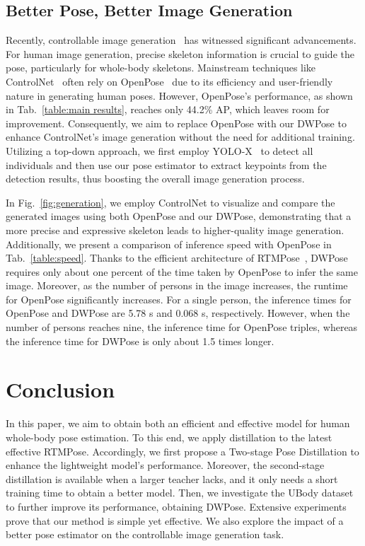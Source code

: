 \documentclass[10pt,twocolumn,letterpaper]{article}
\begin{document}
\subsection{Better Pose, Better Image Generation}
\label{sec:control}

Recently, controllable image generation~\cite{gong2023talecrafter,rombach2022high,sohl2015deep,zhang2023adding,mou2023t2i,ju2023humansd} has witnessed significant advancements. For human image generation, precise skeleton information is crucial to guide the pose, particularly for whole-body skeletons.
Mainstream techniques like ControlNet~\cite{zhang2023adding} often rely on OpenPose~\cite{cao2021openpose} due to its efficiency and user-friendly nature in generating human poses. However, OpenPose's performance, as shown in Tab.~\ref{table:main results}, reaches only 44.2\% AP, which leaves room for improvement. Consequently, we aim to replace OpenPose with our DWPose to enhance ControlNet's image generation without the need for additional training. Utilizing a top-down approach, we first employ YOLO-X~\cite{ge2021yolox} to detect all individuals and then use our pose estimator to extract keypoints from the detection results, thus boosting the overall image generation process.

In Fig.~\ref{fig:generation}, we employ ControlNet to visualize and compare the generated images using both OpenPose and our DWPose, demonstrating that a more precise and expressive skeleton leads to higher-quality image generation. Additionally, we present a comparison of inference speed with OpenPose in Tab.~\ref{table:speed}. Thanks to the efficient architecture of RTMPose~\cite{jiang2023rtmpose}, DWPose requires only about one percent of the time taken by OpenPose to infer the same image. Moreover, as the number of persons in the image increases, the runtime for OpenPose significantly increases. For a single person, the inference times for OpenPose and DWPose are 5.78 s and 0.068 s, respectively. However, when the number of persons reaches nine, the inference time for OpenPose triples, whereas the inference time for DWPose is only about 1.5 times longer.


\section{Conclusion}
In this paper, we aim to obtain both an efficient and effective model for human whole-body pose estimation. To this end, we apply distillation to the latest effective RTMPose. Accordingly, we first propose a Two-stage Pose Distillation to enhance the lightweight model's performance. Moreover, the second-stage distillation is available when a larger teacher lacks, and it only needs a short training time to obtain a better model. Then, we investigate the UBody dataset to further improve its performance, obtaining DWPose. Extensive experiments prove that our method is simple yet effective. We also explore the impact of a better pose estimator on the controllable image generation task.
\end{document}
